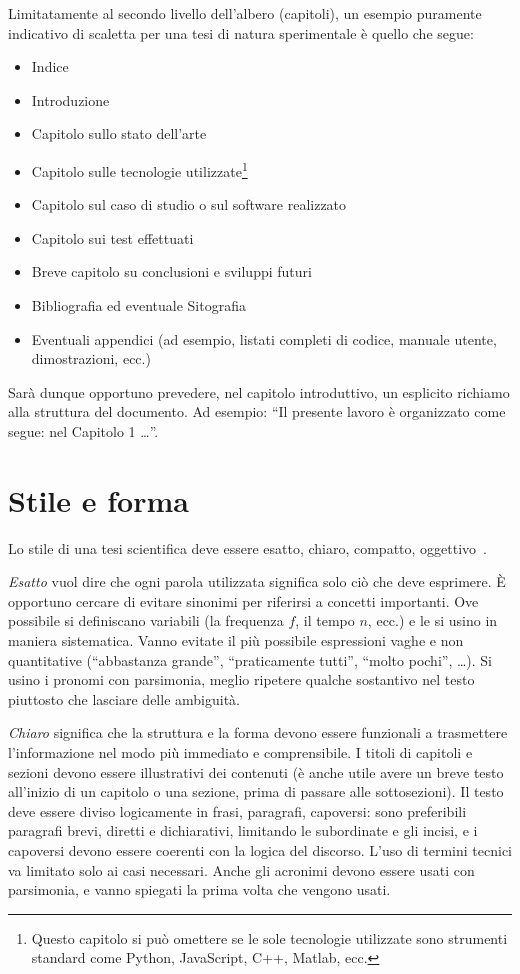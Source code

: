 \documentclass[12pt]{report}
\begin{document}
    Limitatamente al secondo livello dell'albero (capitoli), un esempio puramente indicativo di scaletta per una tesi di natura sperimentale è quello che segue:
    \begin{itemize}
        \item Indice
        \item Introduzione
        \item Capitolo sullo stato dell'arte
        \item Capitolo sulle tecnologie utilizzate\footnote{Questo capitolo si può omettere se le sole tecnologie utilizzate sono strumenti standard come Python, JavaScript, C++, Matlab, ecc.}
        \item Capitolo sul caso di studio o sul software realizzato
        \item Capitolo sui test effettuati
        \item Breve capitolo su conclusioni e sviluppi futuri
        \item Bibliografia ed eventuale Sitografia
        \item Eventuali appendici (ad esempio, listati completi di codice, manuale utente, dimostrazioni, ecc.)
    \end{itemize}
    Sarà dunque opportuno prevedere, nel capitolo introduttivo, un esplicito richiamo alla struttura del documento. Ad esempio: ``Il presente lavoro \`{e} organizzato come segue: nel Capitolo 1 \dots''.



    \section{Stile e forma}
    \label{sec:forma}


    Lo stile di una tesi scientifica deve essere esatto, chiaro, compatto, oggettivo~\cite{strunk1999style}.

        {\em Esatto} vuol dire che ogni parola utilizzata significa solo ci\`o che deve esprimere. \`E opportuno cercare di evitare sinonimi per riferirsi a concetti importanti. Ove possibile si definiscano variabili (la frequenza $f$, il tempo $n$, ecc.) e le si usino in maniera sistematica. Vanno evitate il pi\`u possibile espressioni vaghe e non quantitative (``abbastanza grande'', ``praticamente tutti'', ``molto pochi'', \ldots). Si usino i pronomi con parsimonia, meglio ripetere qualche sostantivo nel testo piuttosto che lasciare delle ambiguit\`a.

        {\em Chiaro} significa che la struttura e la forma devono essere funzionali a trasmettere l'informazione nel modo pi\`u immediato e comprensibile. I titoli di capitoli e sezioni devono essere illustrativi dei contenuti (\`e anche utile avere un breve testo all'inizio di un capitolo o una sezione, prima di passare alle sottosezioni). Il testo deve essere diviso logicamente in frasi, paragrafi, capoversi: sono preferibili paragrafi brevi, diretti e dichiarativi, limitando le subordinate e gli incisi, e i capoversi devono essere coerenti con la logica del discorso. L'uso di termini tecnici va limitato solo ai casi necessari. Anche gli acronimi devono essere usati con parsimonia, e vanno spiegati la prima volta che vengono usati.
\end{document}

